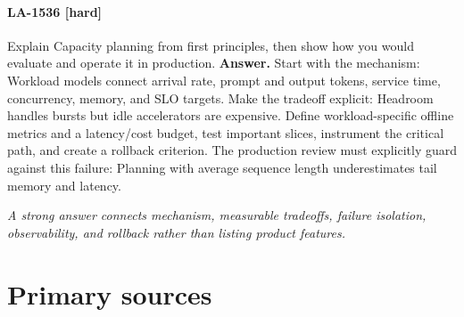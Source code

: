 \paragraph{LA-1536 [hard]} Explain Capacity planning from first principles, then show how you would evaluate and operate it in production.
\noindent\textbf{Answer.} Start with the mechanism: Workload models connect arrival rate, prompt and output tokens, service time, concurrency, memory, and SLO targets. Make the tradeoff explicit: Headroom handles bursts but idle accelerators are expensive. Define workload-specific offline metrics and a latency/cost budget, test important slices, instrument the critical path, and create a rollback criterion. The production review must explicitly guard against this failure: Planning with average sequence length underestimates tail memory and latency.
\par\textit{A strong answer connects mechanism, measurable tradeoffs, failure isolation, observability, and rollback rather than listing product features.}
\clearpage\section{Primary sources}

